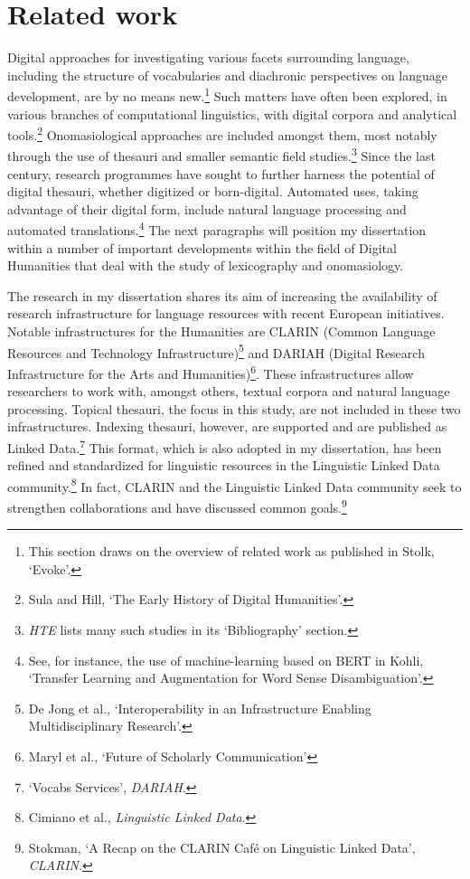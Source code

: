 \section{Related work}
\label{sect:Introduction:Related}

Digital approaches for investigating various facets surrounding language, including the structure of vocabularies and diachronic perspectives on language development, are by no means new.\footnote{This section draws on the overview of related work as published in Stolk, `Evoke'.} Such matters have often been explored, in various branches of computational linguistics, with digital corpora and analytical tools.\footnote{Sula and Hill, `The Early History of Digital Humanities'.} Onomasiological approaches are included amongst them, most notably through the use of thesauri and smaller semantic field studies.\footnote{\textit{HTE} lists many such studies in its `Bibliography' section.} Since the last century, research programmes have sought to further harness the potential of digital thesauri, whether digitized or born-digital. Automated uses, taking advantage of their digital form, include natural language processing and automated translations.\footnote{See, for instance, the use of machine-learning based on BERT in Kohli, `Transfer Learning and Augmentation for Word Sense Disambiguation'.} The next paragraphs will position my dissertation within a number of important developments within the field of Digital Humanities that deal with the study of lexicography and onomasiology.

The research in my dissertation shares its aim of increasing the availability of research infrastructure for language resources with recent European initiatives. Notable infrastructures for the Humanities are CLARIN (Common Language Resources and Technology Infrastructure)\footnote{De Jong et al., `Interoperability in an Infrastructure Enabling Multidisciplinary Research'.} and DARIAH (Digital Research Infrastructure for the Arts and Humanities)\footnote{Maryl et al., `Future of Scholarly Communication'}. These infrastructures allow researchers to work with, amongst others, textual corpora and natural language processing. Topical thesauri, the focus in this study, are not included in these two infrastructures. Indexing thesauri, however, are supported and are published as Linked Data.\footnote{`Vocabs Services', \textit{DARIAH}.} This format, which is also adopted in my dissertation, has been refined and standardized for linguistic resources in the Linguistic Linked Data community.\footnote{Cimiano et al., \textit{Linguistic Linked Data}.} In fact, CLARIN and the Linguistic Linked Data community seek to strengthen collaborations and have discussed common goals.\footnote{Stokman, `A Recap on the CLARIN Café on Linguistic Linked Data', \textit{CLARIN}.}

